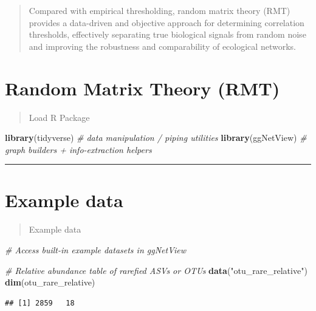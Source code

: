 \documentclass[
]{book}
\newenvironment{Shaded}{\begin{snugshade}}{\end{snugshade}}
\newcommand{\CommentTok}[1]{\textcolor[rgb]{0.56,0.35,0.01}{\textit{#1}}}
\newcommand{\FunctionTok}[1]{\textcolor[rgb]{0.13,0.29,0.53}{\textbf{#1}}}
\newcommand{\NormalTok}[1]{#1}
\newcommand{\StringTok}[1]{\textcolor[rgb]{0.31,0.60,0.02}{#1}}
\begin{document}
\begin{quote}
Compared with empirical thresholding, random matrix theory (RMT) provides a data-driven and objective approach for determining correlation thresholds, effectively separating true biological signals from random noise and improving the robustness and comparability of ecological networks.
\end{quote}

\section{Random Matrix Theory (RMT)}\label{random-matrix-theory-rmt}

\begin{quote}
Load R Package
\end{quote}

\begin{Shaded}
\begin{Highlighting}[]
\FunctionTok{library}\NormalTok{(tidyverse)   }\CommentTok{\# data manipulation / piping utilities}
\FunctionTok{library}\NormalTok{(ggNetView)   }\CommentTok{\# graph builders + info{-}extraction helpers}
\end{Highlighting}
\end{Shaded}

\begin{center}\rule{0.5\linewidth}{0.5pt}\end{center}

\section{Example data}\label{example-data}

\begin{quote}
Example data
\end{quote}

\begin{Shaded}
\begin{Highlighting}[]
\CommentTok{\# Access built{-}in example datasets in ggNetView}

\CommentTok{\# Relative abundance table of rarefied ASVs or OTUs}
\FunctionTok{data}\NormalTok{(}\StringTok{"otu\_rare\_relative"}\NormalTok{)}
\FunctionTok{dim}\NormalTok{(otu\_rare\_relative)}
\end{Highlighting}
\end{Shaded}

\begin{verbatim}
## [1] 2859   18
\end{verbatim}
\end{document}
